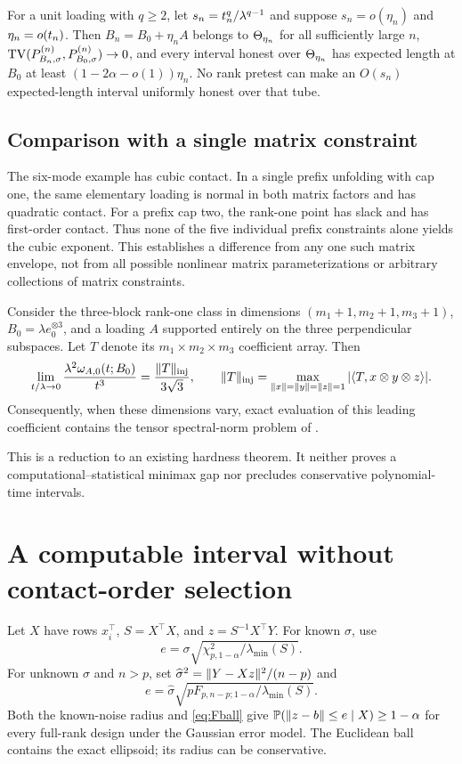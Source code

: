 \begin{corollary}\label{cor:pretest}
For a unit loading with $q\ge2$, let $s_n=t_n^q/\lambda^{q-1}$ and suppose $s_n=o(\eta_n)$ and $\eta_n=o(t_n)$. Then $B_n=B_0+\eta_n A$ belongs to $\Theta_{\eta_n}$ for all sufficiently large $n$, $\operatorname{TV}(P_{B_n,\sigma}^{(n)},P_{B_0,\sigma}^{(n)})\to0$, and every interval honest over $\Theta_{\eta_n}$ has expected length at $B_0$ at least $(1-2\alpha-o(1))\eta_n$. No rank pretest can make an $O(s_n)$ expected-length interval uniformly honest over that tube.
\end{corollary}

\subsection{Comparison with a single matrix constraint}
The six-mode example has cubic contact. In a single prefix unfolding with cap one, the same elementary loading is normal in both matrix factors and has quadratic contact. For a prefix cap two, the rank-one point has slack and has first-order contact. Thus none of the five individual prefix constraints alone yields the cubic exponent. This establishes a difference from any one such matrix envelope, not from all possible nonlinear matrix parameterizations or arbitrary collections of matrix constraints.

\begin{proposition}\label{prop:hardness}
Consider the three-block rank-one class in dimensions $(m_1+1,m_2+1,m_3+1)$, $B_0=\lambda e_0^{\otimes3}$, and a loading $A$ supported entirely on the three perpendicular subspaces. Let $T$ denote its $m_1\times m_2\times m_3$ coefficient array. Then
\[
 \lim_{t/\lambda\to0}\frac{\lambda^2\omega_{A,0}(t;B_0)}{t^3}
 =\frac{\lVert T\rVert_{\rm inj}}{3\sqrt3},\qquad
 \lVert T\rVert_{\rm inj}=\max_{\lVert x\rVert=\lVert y\rVert=\lVert z\rVert=1}|\langle T,x\otimes y\otimes z\rangle|.
\]
Consequently, when these dimensions vary, exact evaluation of this leading coefficient contains the tensor spectral-norm problem of \citet{hillarlim2013}.
\end{proposition}
This is a reduction to an existing hardness theorem. It neither proves a computational--statistical minimax gap nor precludes conservative polynomial-time intervals.

\section{A computable interval without contact-order selection}\label{sec:method}
Let $X$ have rows $x_i^\top$, $S=X^\top X$, and $z=S^{-1}X^\top Y$. For known $\sigma$, use
\[
 e=\sigma\sqrt{\chi^2_{p,1-\alpha}/\lambda_{\min}(S)}.
\]
For unknown $\sigma$ and $n>p$, set $\widehat\sigma^2=\lVert Y-Xz\rVert^2/(n-p)$ and
\begin{equation}\label{eq:Fball}
 e=\widehat\sigma\sqrt{pF_{p,n-p;1-\alpha}/\lambda_{\min}(S)}.
\end{equation}
Both the known-noise radius and \eqref{eq:Fball} give $\mathbb P(\lVert z-b\rVert\le e\mid X)\ge1-\alpha$ for every full-rank design under the Gaussian error model. The Euclidean ball contains the exact ellipsoid; its radius can be conservative.

